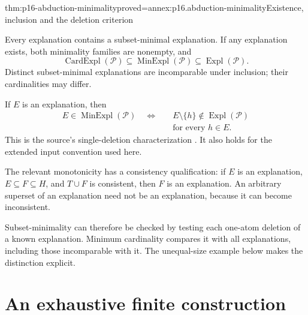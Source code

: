 \begin{hbtheorem}{thm:p16-abduction-minimality}{proved=annex:p16.abduction-minimality}{Existence, inclusion and the deletion criterion}
\par\nobreak
Every explanation contains a subset-minimal explanation. If any explanation
exists, both minimality families are nonempty, and
\[
 \operatorname{CardExpl}(\mathcal P)
        \subseteq\operatorname{MinExpl}(\mathcal P)
        \subseteq\operatorname{Expl}(\mathcal P).
\]
Distinct subset-minimal explanations are incomparable under inclusion;
their cardinalities may differ.

If \(E\) is an explanation, then
\[
\begin{aligned}
 E\in\operatorname{MinExpl}(\mathcal P)
 \quad\Longleftrightarrow\quad&
 E\setminus\{h\}\notin\operatorname{Expl}(\mathcal P)
                  \\
 &\text{for every }h\in E.
\end{aligned}
\]
This is the source's single-deletion characterization
\cite[prop.~2.1, p.~11]{EiterGottlobAbductionManuscript}.
It also holds for the extended input convention used here.

The relevant monotonicity has a consistency qualification: if \(E\) is
an explanation, \(E\subseteq F\subseteq H\), and \(T\cup F\) is
consistent, then \(F\) is an explanation. An arbitrary superset of an
explanation need not be an explanation, because it can become inconsistent.
\end{hbtheorem}

Subset-minimality can therefore be checked by testing each one-atom
deletion of a known explanation. Minimum cardinality compares it with all
explanations, including those incomparable with it. The unequal-size example
below makes the distinction explicit.

\section{An exhaustive finite construction}
\label{sec:p16-abduction-enumeration}

